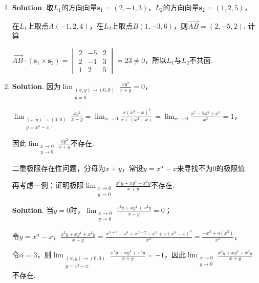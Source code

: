\documentclass[../Main.tex]{subfiles}
\begin{document}
\begin{enumerate}
    \item \textbf{Solution}. 取$L_{1}$的方向向量$\boldsymbol{s}_{1} =(2,-1,3)$，$L
                  _{2}$的方向向量$\boldsymbol{s}_{2} =(1,2,5)$，

          在$L_{1}$上取点$A(-1,2,4)$，在$L_{2}$上取点$B(1,-3,6)$，则$\overrightarrow{AB}
              = (2,-5,2)$. 计算

          $\overrightarrow{AB}\cdot \left(\boldsymbol{s}_{1} \times \boldsymbol{s}_{2}
              \right) =
              \begin{vmatrix}
                  2 & -5 & 2 \\
                  2 & -1 & 3 \\
                  1 & 2  & 5
              \end{vmatrix}
              = 23\neq0$，所以$L_{1}$与$L_{2}$不共面.

    \item \textbf{Solution}. 因为$\lim_{\substack{(x,y)\to (0,0) \\ y = 0}}\frac{x
                  y^{2}}{x+y}= 0$，

          $\lim_{\substack{(x,y)\to (0,0) \\ y=x^3-x}}\frac{x y^{2}}{x+y}= \lim_{x\to0}
              \frac{x(x^{3}-x)^{2}}{x+(x^{3}-x)}= \lim_{x\to0}\frac{x^{7}-2x^{5}+x^{3}}{x^{3}}
              =1$，

          因此$\lim_{\substack{x\to 0 \\ y\to 0}}\frac{x y^{2}}{x+y}$不存在.

          二重极限存在性问题，分母为$x+y$，常设$y = x^{\alpha}- x$来寻找不为0的极限值.

          再考虑一例：证明极限$\lim_{\substack{x\to 0 \\ y\to 0}}\frac{x^{3}y+xy^{4}+x^{2}y}{x+y}$不存在.

          \textbf{Solution}. 当$y=0$时，$\lim_{\substack{x\to 0 \\ y\to 0}}\frac{x^{3}y+xy^{4}+x^{2}y}{x+y}
              = 0$；

          令$y = x^{\alpha}- x$，$\frac{x^{3}y+xy^{4}+x^{2}y}{x+y}= \frac{x^{\alpha
                          + 3}-x^{4}+x^{\alpha + 2}-x^{3}+x\left(x^{\alpha}-x\right)^{4}}{x^{\alpha}}
              = \frac{-x^{3} + o(x^{3})}{x^{\alpha}}$，

          令$\alpha = 3$，则$\lim_{\substack{(x,y)\to (0,0) \\ y = x^3-x}}\frac{x^{3}y+xy^{4}+x^{2}y}{x+y}
              = -1$，因此$\lim_{\substack{x\to 0 \\ y\to 0}}\frac{x^{3}y+xy^{4}+x^{2}y}{x+y}$不存在.


\end{enumerate}
\end{document}
